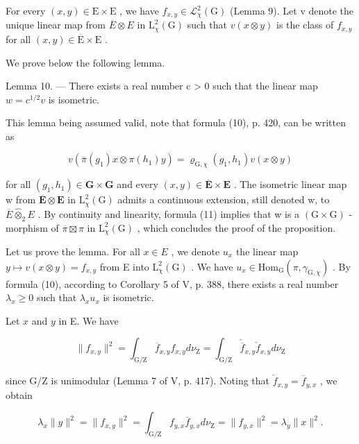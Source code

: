  For every \((x,y)\in\mathrm{E}\times\mathrm{E}\) , we have \(f_{x,y}\in\mathcal{L}_{\chi}^{2}(\mathrm{G})\) (Lemma 9). Let v denote the unique linear map from \(\overline{E}\otimes E\) in \(\mathrm{L}_{\chi}^{2}(\mathrm{G})\) such that \(v(x\otimes y)\) is the class of \(f_{x,y}\) for all \((x,y)\in\overline{\mathrm{E}}\times\mathrm{E}\) .

We prove below the following lemma.

Lemma 10. --- There exists a real number c \textgreater{} 0 such that the linear map \(w = c^{1/2}v\) is isometric.

This lemma being assumed valid, note that formula (10), p. 420, can be written as

\[
v (\overline {{\pi}} (g _ {1}) x \otimes \pi (h _ {1}) y) = \varrho_ {\mathrm{G}, \chi} (g _ {1}, h _ {1}) v (x \otimes y)\tag{11}
\]

 for all \((g_{1}, h_{1}) \in \mathbf{G} \times \mathbf{G}\) and every \((x, y) \in \overline{\mathbf{E}} \times \mathbf{E}\) . The isometric linear map w from \(\overline{\mathbf{E}} \otimes \mathbf{E}\) in \(\mathrm{L}_{\chi}^{2}(\mathrm{G})\) admits a continuous extension, still denoted w, to \(\overline{E} \widehat{\otimes}_{2} E\) . By continuity and linearity, formula (11) implies that w is a \((\mathrm{G} \times \mathrm{G})\) -morphism of \(\overline{\pi} \boxtimes \pi\) in \(\mathrm{L}_{\chi}^{2}(\mathrm{G})\) , which concludes the proof of the proposition.

 Let us prove the lemma. For all \(x \in E\) , we denote \(u_{x}\) the linear map \(y \mapsto v(x \otimes y) = f_{x,y}\) from E into \(\mathrm{L}_{\chi}^{2}(\mathrm{G})\) . We have \(u_{x} \in \mathrm{Hom}_{\mathrm{G}}(\pi, \gamma_{\mathrm{G},\chi})\) . By formula (10), according to Corollary 5 of V, p. 388, there exists a real number \(\lambda_{x} \geqslant 0\) such that \(\lambda_{x}u_{x}\) is isometric.

Let \(x\) and \(y\) in E. We have

\[
\| f _ {x, y} \| ^ {2} = \int_ {\mathrm{G/Z}} \overline {{f}} _ {x, y} f _ {x, y} d \nu_ {\mathrm{Z}} = \int_ {\mathrm{G/Z}} \check {\overline {{f}}} _ {x, y} \check {f} _ {x, y} d \nu_ {\mathrm{Z}}
\]

since G/Z is unimodular (Lemma 7 of V, p. 417). Noting that \(\check{f}_{x,y} = \overline{f}_{y,x}\) , we obtain

\[
\lambda_ {x} \| y \| ^ {2} = \| f _ {x, y} \| ^ {2} = \int_ {\mathrm{G/Z}} f _ {y, x} \overline {{f}} _ {y, x} d \nu_ {\mathrm{Z}} = \| f _ {y, x} \| ^ {2} = \lambda_ {y} \| x \| ^ {2}.
\]

